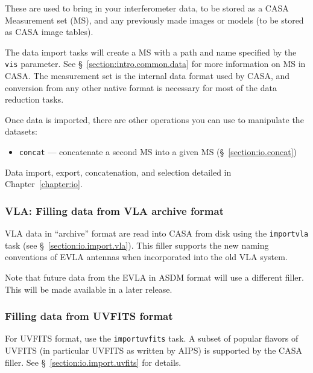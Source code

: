 These are used to bring in your interferometer data, to be stored
as a CASA Measurement set (MS), and any previously made images
or models (to be stored as CASA image tables).  

The data import tasks will create a MS with a path and name specified
by the {\tt vis} parameter.  See \S~\ref{section:intro.common.data}
for more information on MS in CASA.  The measurement set is the 
internal data format used by CASA, and conversion from any other
native format is necessary for most of the data reduction tasks.

Once data is imported, there are other operations you can use to
manipulate the datasets:
\begin{itemize}
   \item {\tt concat} --- concatenate a second MS into a
         given MS (\S~\ref{section:io.concat})
\end{itemize}

Data import, export, concatenation, and selection
detailed in Chapter~\ref{chapter:io}.

\subsubsection{VLA: Filling data from VLA archive format}
\label{section:intro.walkthru.load.VLAfill}

VLA data in ``archive'' format are read into CASA from disk using
the {\tt importvla} task (see \S~\ref{section:io.import.vla}).  
This filler supports the new naming conventions of EVLA antennas
when incorporated into the old VLA system.


Note that future data from the EVLA in ASDM format will use a
different filler.  This will be made available in a later release.

\subsubsection{Filling data from UVFITS format}
\label{section:intro.walkthru.load.uvfits}

For UVFITS format, use the {\tt importuvfits} task. A subset of popular
flavors of UVFITS (in particular UVFITS as written by AIPS) is
supported by the CASA filler.  See \S~\ref{section:io.import.uvfits}
for details.

